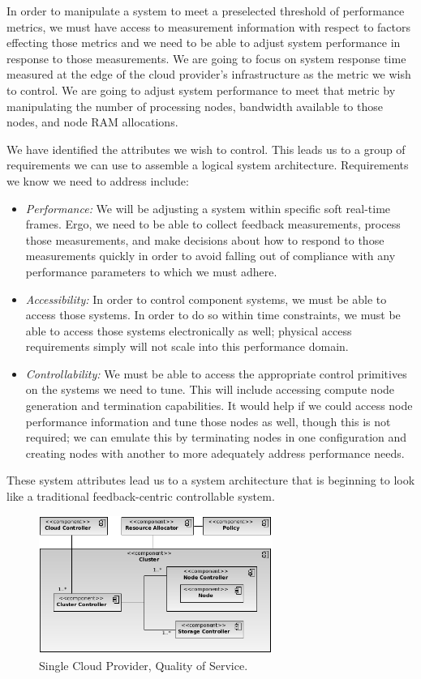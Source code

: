 \documentclass[times, 10pt,twocolumn]{article}
\begin{document}
In order to manipulate a system to meet a preselected threshold of performance metrics, we must have access to measurement information with respect to factors effecting those metrics and we need to be able to adjust system performance in response to those measurements.  We are going to focus on system response time measured at the edge of the cloud provider's infrastructure as the metric we wish to control.  We are going to adjust system performance to meet that metric by manipulating the number of processing nodes, bandwidth available to those nodes, and node RAM allocations.

We have identified the attributes we wish to control.  This leads us to a group of requirements we can use to assemble a logical system architecture.  Requirements we know we need to address include:

\begin{itemize}
\item \textit{Performance:} We will be adjusting a system within specific soft real-time frames.  Ergo, we need to be able to collect feedback measurements, process those measurements, and make decisions about how to respond to those measurements quickly in order to avoid falling out of compliance with any performance parameters to which we must adhere.
\item \textit{Accessibility:} In order to control component systems, we must be able to access those systems.  In order to do so within time constraints, we must be able to access those systems electronically as well; physical access requirements simply will not scale into this performance domain.
\item \textit{Controllability:} We must be able to access the appropriate control primitives on the systems we need to tune.  This will include accessing compute node generation and termination capabilities.  It would help if we could access node performance information and tune those nodes as well, though this is not required; we can emulate this by terminating nodes in one configuration and creating nodes with another to more adequately address performance needs.
\end{itemize}

These system attributes lead us to a system architecture that is beginning to look like a traditional feedback-centric controllable system.

\begin{figure}[!t]
\centering
\includegraphics[width=3in]{Single-QoS}
\caption{Single Cloud Provider, Quality of Service.}
\label{fig:single-qos}
\end{figure}
\end{document}
